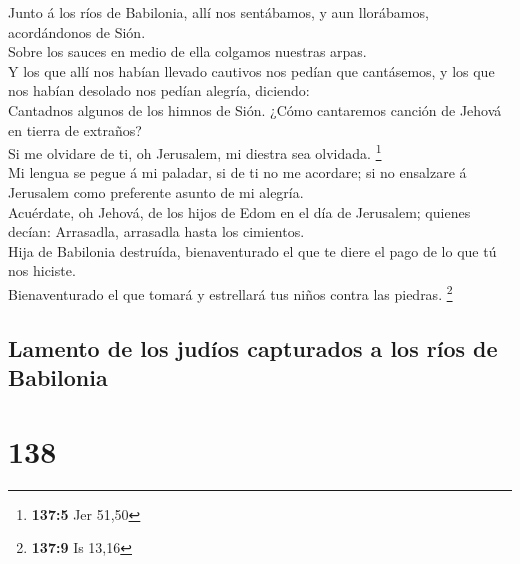  Junto á los ríos de Babilonia, allí nos sentábamos, y aun
llorábamos, acordándonos de Sión.\\
 Sobre los sauces en medio de ella colgamos nuestras
arpas.\\
 Y los que allí nos habían llevado cautivos nos pedían que
cantásemos, y los que nos habían desolado nos pedían alegría,
diciendo:\\
 Cantadnos algunos de los himnos de Sión. ¿Cómo cantaremos
canción de Jehová en tierra de extraños?\\
 Si me olvidare de ti, oh Jerusalem, mi diestra sea
olvidada. \footnote{\textbf{137:5} Jer 51,50}\\
 Mi lengua se pegue á mi paladar, si de ti no me acordare;
si no ensalzare á Jerusalem como preferente asunto de mi alegría.\\
 Acuérdate, oh Jehová, de los hijos de Edom en el día de
Jerusalem; quienes decían: Arrasadla, arrasadla hasta los cimientos.\\
 Hija de Babilonia destruída, bienaventurado el que te
diere el pago de lo que tú nos hiciste.\\
 Bienaventurado el que tomará y estrellará tus niños
contra las piedras. \footnote{\textbf{137:9} Is 13,16}

\hypertarget{lamento-de-los-juduxedos-capturados-a-los-ruxedos-de-babilonia-1}{%
\subsection{Lamento de los judíos capturados a los ríos de
Babilonia}\label{lamento-de-los-juduxedos-capturados-a-los-ruxedos-de-babilonia-1}}

\hypertarget{section-137}{%
\section{138}\label{section-137}}

